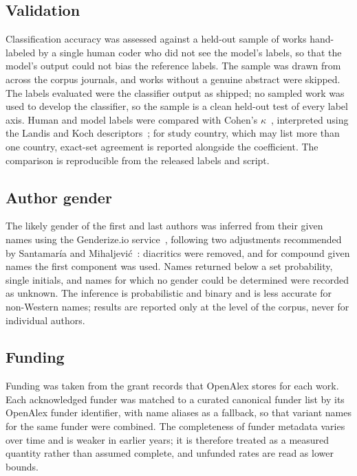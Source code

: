 \subsection{Validation}

Classification accuracy was assessed against a held-out sample of works
hand-labeled by a single human coder who did not see the model's labels, so
that the model's output could not bias the reference labels. The sample was
drawn from across the corpus journals, and works without a genuine abstract
were skipped. The labels evaluated were the classifier output as shipped; no
sampled work was used to develop the classifier, so the sample is a clean
held-out test of every label axis. Human and model labels were compared with
Cohen's $\kappa$~\cite{cohen1960}, interpreted using the Landis and Koch
descriptors~\cite{landis1977}; for study country, which may list more than one
country, exact-set agreement is reported alongside the coefficient. The
comparison is reproducible from the released labels and script.

\subsection{Author gender}

The likely gender of the first and last authors was inferred from their given
names using the Genderize.io service~\cite{genderize}, following two
adjustments recommended by Santamar\'ia and Mihaljevi\'c~\cite{santamaria2018}:
diacritics were removed, and for compound given names the first component was
used. Names returned below a set probability, single initials, and names for
which no gender could be determined were recorded as unknown. The inference is
probabilistic and binary and is less accurate for non-Western names; results
are reported only at the level of the corpus, never for individual authors.

\subsection{Funding}

Funding was taken from the grant records that OpenAlex stores for each work.
Each acknowledged funder was matched to a curated canonical funder list by its
OpenAlex funder identifier, with name aliases as a fallback, so that variant
names for the same funder were combined. The completeness of funder metadata
varies over time and is weaker in earlier years; it is therefore treated as a
measured quantity rather than assumed complete, and unfunded rates are read as
lower bounds.

